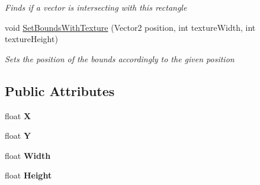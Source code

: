 \begin{DoxyCompactItemize}
\begin{DoxyCompactList}\small\item\em Finds if a vector is intersecting with this rectangle \end{DoxyCompactList}\item 
void \hyperlink{class_hel_project_1_1_tools_1_1_f_rectangle_af85c47017ac547826574b8911e45d38e}{Set\+Bounds\+With\+Texture} (Vector2 position, int texture\+Width, int texture\+Height)
\begin{DoxyCompactList}\small\item\em Sets the position of the bounds accordingly to the given position \end{DoxyCompactList}\end{DoxyCompactItemize}
\subsection*{Public Attributes}
\begin{DoxyCompactItemize}
\item 
\hypertarget{class_hel_project_1_1_tools_1_1_f_rectangle_a2e7448760acba0c9d18695c94a4f1c74}{}float {\bfseries X}\label{class_hel_project_1_1_tools_1_1_f_rectangle_a2e7448760acba0c9d18695c94a4f1c74}

\item 
\hypertarget{class_hel_project_1_1_tools_1_1_f_rectangle_a9dd39040f0f47aa5d42c8cb9b8b0d66f}{}float {\bfseries Y}\label{class_hel_project_1_1_tools_1_1_f_rectangle_a9dd39040f0f47aa5d42c8cb9b8b0d66f}

\item 
\hypertarget{class_hel_project_1_1_tools_1_1_f_rectangle_a6a4e7ce8a2da42007c769090d4c455a8}{}float {\bfseries Width}\label{class_hel_project_1_1_tools_1_1_f_rectangle_a6a4e7ce8a2da42007c769090d4c455a8}

\item 
\hypertarget{class_hel_project_1_1_tools_1_1_f_rectangle_a92884a5079f4801afe7b1bfd38f911af}{}float {\bfseries Height}\label{class_hel_project_1_1_tools_1_1_f_rectangle_a92884a5079f4801afe7b1bfd38f911af}

\end{DoxyCompactItemize}
